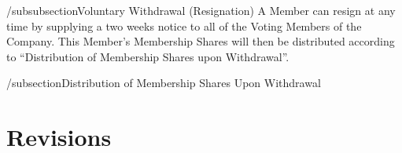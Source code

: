 \documentclass[11pt]{article}
\begin{document}
/subsubsection{Voluntary Withdrawal (Resignation)}
A Member can resign at any time by supplying a two weeks notice to all of the Voting Members of the Company. This Member’s Membership Shares will then be distributed according to “Distribution of Membership Shares upon Withdrawal”.

/subsection{Distribution of Membership Shares Upon Withdrawal}

\section{Revisions}

\vspace*{\fill}

\begin{flushright}

\pdfcreationdate
\end{flushright}
\end{document}
